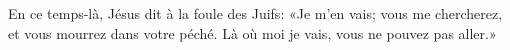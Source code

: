 En ce temps-là, Jésus dit à la foule des Juifs:
	«Je m’en vais; vous me chercherez, et vous mourrez dans votre péché.
	Là où moi je vais, vous ne pouvez pas aller.»
